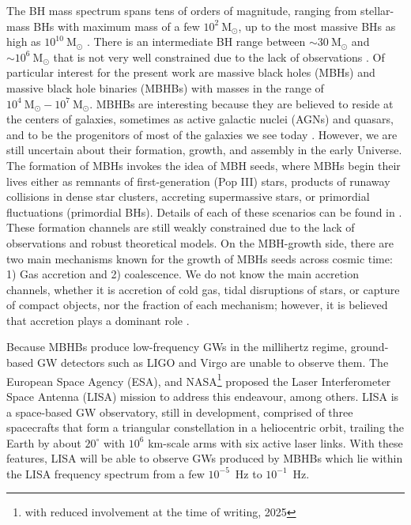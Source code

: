 \documentclass[a4paper,12pt]{article}
\begin{document}
The BH mass spectrum spans tens of orders of magnitude, ranging from stellar-mass BHs with maximum mass of a few $10^{2}~\mathrm{M}_{\odot}$, up to the most massive BHs as high as $10^{10}~\mathrm{M}_{\odot}$ \cite{amaro2023astrophysics}. There is an intermediate BH range between $\sim30~\mathrm{M}_{\odot}$ and $\sim10^{6}~\mathrm{M}_{\odot}$ that is not very well constrained due to the lack of observations \cite{colpi2014massive}. Of particular interest for the present work are massive black holes (MBHs) and massive black hole binaries (MBHBs) with masses in the range of $10^{4}~\mathrm{M}_{\odot}-10^{7}~\mathrm{M}_{\odot}$. MBHBs are interesting because they are believed to reside at the centers of galaxies, sometimes as active galactic nuclei (AGNs) and quasars, and to be the progenitors of most of the galaxies we see today \cite{mortlock2011luminous,banados2016pan}. However, we are still uncertain about their formation, growth, and assembly in the early Universe. The formation of MBHs invokes the idea of MBH seeds, where MBHs begin their lives either as remnants of first-generation (Pop III) stars, products of runaway collisions in dense star clusters, accreting supermassive stars, or primordial fluctuations (primordial BHs). Details of each of these scenarios can be found in \cite{volonteri2010formation,johnson2016early,valiante2017formation,inayoshi2020assembly,volonteri2021origins}. These formation channels are still weakly constrained due to the lack of observations and robust theoretical models. On the MBH-growth side, there are two main mechanisms known for the growth of MBHs seeds across cosmic time: 1) Gas accretion and 2) coalescence. We do not know the main accretion channels, whether it is accretion of cold gas, tidal disruptions of stars, or capture of compact objects, nor the fraction of each mechanism; however, it is believed that accretion plays a dominant role \cite{pacucci2020separating,piana2021mass}.

Because MBHBs produce low-frequency GWs in the millihertz regime, ground-based GW detectors such as LIGO and Virgo are unable to observe them. The European Space Agency (ESA), and NASA\footnote{with reduced involvement at the time of writing, 2025} proposed the Laser Interferometer Space Antenna (LISA) mission \cite{amaro2017laser} to address this endeavour, among others. LISA is a space-based GW observatory, still in development, comprised of three spacecrafts that form a triangular constellation in a heliocentric orbit, trailing the Earth by about $20^{\circ}$ with $10^{6}$ km-scale arms with six active laser links. With these features, LISA will be able to observe GWs produced by MBHBs which lie within the LISA frequency spectrum from a few $10^{-5}$~Hz to $10^{-1}$~Hz.
\end{document}
